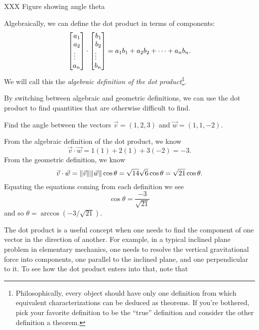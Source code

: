 XXX Figure showing angle theta

Algebraically, we can define the dot product in terms of components:
\[
	\mat{a_1\\a_2\\\vdots\,\,\,\, \\a_n}\cdot \mat{b_1\\b_2\\\vdots\,\,\,\,\\b_n}
	=a_1b_1+a_2b_2+\cdots+a_nb_n.
\]
We will call this the \emph{algebraic definition of the dot product}\footnote{
	Philosophically,
every object should have only one definition from which equivalent characterizations
can be deduced as theorems.  If you're bothered, pick your favorite definition
to be the ``true'' definition and consider the other definition a theorem.
}.

By switching between algebraic and geometric definitions, we can use the dot
product to find quantities that are otherwise difficult to find.
\begin{example}
	Find the angle between the vectors $\vec v=(1,2,3)$ and $\vec w=(1,1,-2)$.

	From the algebraic definition of the dot product, we know
	\[
		\vec v\cdot \vec w = 1(1)+2(1)+3(-2) = -3.
	\]
	From the geometric definition, we know
	\[
		\vec v\cdot \vec w=\lVert\vec v\rVert\lVert\vec w\rVert\cos\theta
		=\sqrt{14}\sqrt{6}\cos\theta=\sqrt{21}\cos\theta.
	\]
	Equating the equations coming from each definition we see
	\[
		\cos\theta = \frac{-3}{\sqrt{21}}
	\]
	and so $\theta=\arccos(-3/\sqrt{21})$.
\end{example}

The dot product is a useful concept when one needs to find the
component of one vector in the direction of another.  For example,
in a typical inclined plane problem in elementary mechanics, one
needs to resolve the vertical gravitational force into components,
one parallel to the inclined plane, and one perpendicular to it.
To see how the dot product enters into that, note that
